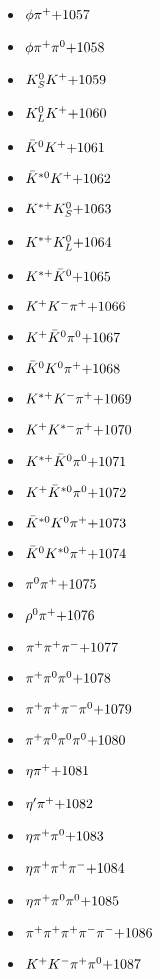 \begin{multicols}{3}
\begin{itemize}
 \item $ \phi \pi^{+} \hfill{+1057}$
 \item $ \phi \pi^{+} \pi^{0} \hfill{+1058}$
 \item $ K_{S}^{0} K^{+} \hfill{+1059}$
 \item $ K_{L}^{0} K^{+} \hfill{+1060}$
 \item $ \bar{K}^{0} K^{+} \hfill{+1061}$
 \item $ \bar{K}^{*0} K^{+} \hfill{+1062}$
 \item $ K^{*+} K_{S}^{0} \hfill{+1063}$
 \item $ K^{*+} K_{L}^{0} \hfill{+1064}$
 \item $ K^{*+} \bar{K}^{0} \hfill{+1065}$
 \item $ K^{+} K^{-} \pi^{+} \hfill{+1066}$
 \item $ K^{+} \bar{K}^{0} \pi^{0} \hfill{+1067}$
 \item $ \bar{K}^{0} K^{0} \pi^{+} \hfill{+1068}$
 \item $ K^{*+} K^{-} \pi^{+} \hfill{+1069}$
 \item $ K^{+} K^{*-} \pi^{+} \hfill{+1070}$
 \item $ K^{*+} \bar{K}^{0} \pi^{0} \hfill{+1071}$
 \item $ K^{+} \bar{K}^{*0} \pi^{0} \hfill{+1072}$
 \item $ \bar{K}^{*0} K^{0} \pi^{+} \hfill{+1073}$
 \item $ \bar{K}^{0} K^{*0} \pi^{+} \hfill{+1074}$
 \item $ \pi^{0} \pi^{+} \hfill{+1075}$
 \item $ \rho^{0} \pi^{+} \hfill{+1076}$
 \item $ \pi^{+} \pi^{+} \pi^{-} \hfill{+1077}$
 \item $ \pi^{+} \pi^{0} \pi^{0} \hfill{+1078}$
 \item $ \pi^{+} \pi^{+} \pi^{-} \pi^{0} \hfill{+1079}$
 \item $ \pi^{+} \pi^{0} \pi^{0} \pi^{0} \hfill{+1080}$
 \item $ \eta \pi^{+} \hfill{+1081}$
 \item $ {\eta^{\prime}} \pi^{+} \hfill{+1082}$
 \item $ \eta \pi^{+} \pi^{0} \hfill{+1083}$
 \item $ \eta \pi^{+} \pi^{+} \pi^{-} \hfill{+1084}$
 \item $ \eta \pi^{+} \pi^{0} \pi^{0} \hfill{+1085}$
 \item $ \pi^{+} \pi^{+} \pi^{+} \pi^{-} \pi^{-} \hfill{+1086}$
 \item $ K^{+} K^{-} \pi^{+} \pi^{0} \hfill{+1087}$

\end{itemize}
\end{multicols}
